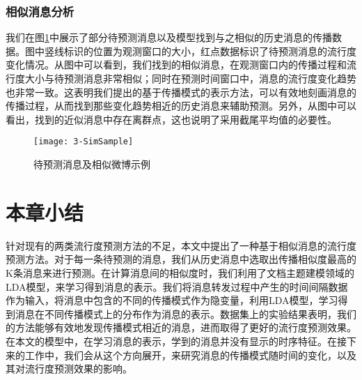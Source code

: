 \subsubsection{相似消息分析}
我们在图\ref{fig:simExample}中展示了部分待预测消息以及模型找到与之相似的历史消息的传播数据。图中竖线标识的位置为观测窗口的大小，红点数据标识了待预测消息的流行度变化情况。从图中可以看到，我们找到的相似消息，在观测窗口内的传播过程和流行度大小与待预测消息非常相似；同时在预测时间窗口中，消息的流行度变化趋势也非常一致。这表明我们提出的基于传播模式的表示方法，可以有效地刻画消息的传播过程，从而找到那些变化趋势相近的历史消息来辅助预测。另外，从图中可以看出，找到的近似消息中存在离群点，这也说明了采用截尾平均值的必要性。
\begin{figure}[!htbp]
  \centering
  \texttt{[image: 3-SimSample]}
  \caption{待预测消息及相似微博示例}
  \label{fig:simExample}
\end{figure}

\section{本章小结}
针对现有的两类流行度预测方法的不足，本文中提出了一种基于相似消息的流行度预测方法。对于每一条待预测的消息，我们从历史消息中选取出传播相似度最高的K条消息来进行预测。在计算消息间的相似度时，我们利用了文档主题建模领域的LDA模型，来学习得到消息的表示。我们将消息转发过程中产生的时间间隔数据作为输入，将消息中包含的不同的传播模式作为隐变量，利用LDA模型，学习得到消息在不同传播模式上的分布作为消息的表示。数据集上的实验结果表明，我们的方法能够有效地发现传播模式相近的消息，进而取得了更好的流行度预测效果。在本文的模型中，在学习消息的表示，学到的消息并没有显示的时序特征。在接下来的工作中，我们会从这个方向展开，来研究消息的传播模式随时间的变化，以及其对流行度预测效果的影响。
